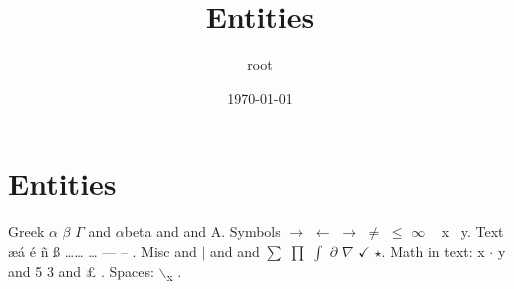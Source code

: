 \documentclass[11pt]{article}
\author{root}
\date{\today}
\title{Entities}
\begin{document}
\maketitle
\tableofcontents

\section{Entities}
\label{sec:orgc107a69}
Greek \(\alpha\) \(\beta\) \(\Gamma\) and \(\alpha\)beta and \alphabet and A.
Symbols \textcopyright{} \textregistered{} \(\rightarrow\) \(\leftarrow\) \(\to\) \(\ne\) \(\le\) \(\infty\) \textpm{} \texttimes{} \textdegree{} ~ x ~y.
Text \ae \'{a} \'{e} \~{n} \ss{} \ldots \dots{} \dots{} --- -- \guillemotleft{} \guillemotright{}.
Misc \hspace*{0.5em}and \(\vert{}\) and \lbrace \rbrace and \(\sum\) \(\prod\) \(\int\) \(\partial\) \(\nabla\) \(\checkmark\) \(\star\).
Math in text: x \(\cdot\) y and 5 \texttimes{} 3 and \texteuro{} \pounds{} \textyen{} \textcent{}.
Spaces: \hspace*{0.5em}$\backslash$\textsubscript{x} \- \zwsp.
\end{document}
